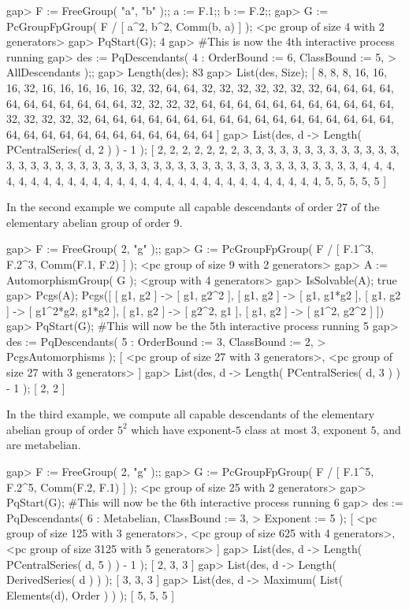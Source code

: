 \beginexample
gap> F := FreeGroup( "a", "b" );; a := F.1;; b := F.2;;
gap> G := PcGroupFpGroup( F / [ a^2, b^2, Comm(b, a) ] );
<pc group of size 4 with 2 generators>
gap> PqStart(G);
4
gap> #This is now the 4th interactive process running
gap> des := PqDescendants( 4 : OrderBound := 6, ClassBound := 5,
>                              AllDescendants );;
gap> Length(des);
83
gap> List(des, Size);
[ 8, 8, 8, 16, 16, 16, 32, 16, 16, 16, 16, 16, 32, 32, 64, 64, 32, 32, 32, 
  32, 32, 32, 32, 64, 64, 64, 64, 64, 64, 64, 64, 64, 64, 64, 32, 32, 32, 32, 
  64, 64, 64, 64, 64, 64, 64, 64, 64, 64, 64, 32, 32, 32, 32, 32, 64, 64, 64, 
  64, 64, 64, 64, 64, 64, 64, 64, 64, 64, 64, 64, 64, 64, 64, 64, 64, 64, 64, 
  64, 64, 64, 64, 64, 64, 64 ]
gap> List(des, d -> Length( PCentralSeries( d, 2 ) ) - 1 );
[ 2, 2, 2, 2, 2, 2, 2, 3, 3, 3, 3, 3, 3, 3, 3, 3, 3, 3, 3, 3, 3, 3, 3, 3, 3, 
  3, 3, 3, 3, 3, 3, 3, 3, 3, 3, 3, 3, 3, 3, 3, 3, 3, 3, 3, 3, 3, 3, 3, 3, 4, 
  4, 4, 4, 4, 4, 4, 4, 4, 4, 4, 4, 4, 4, 4, 4, 4, 4, 4, 4, 4, 4, 4, 4, 4, 4, 
  4, 4, 4, 5, 5, 5, 5, 5 ]
\endexample

In the second example we compute all  capable descendants of order  27 of
the  elementary abelian group of order 9.  

\beginexample
gap> F := FreeGroup( 2, "g" );;                                 
gap> G := PcGroupFpGroup( F / [ F.1^3, F.2^3, Comm(F.1, F.2) ] );
<pc group of size 9 with 2 generators>
gap> A := AutomorphismGroup( G );
<group with 4 generators>
gap> IsSolvable(A);
true
gap> Pcgs(A);
Pcgs([ [ g1, g2 ] -> [ g1, g2^2 ], [ g1, g2 ] -> [ g1, g1*g2 ], 
  [ g1, g2 ] -> [ g1^2*g2, g1*g2 ], [ g1, g2 ] -> [ g2^2, g1 ], 
  [ g1, g2 ] -> [ g1^2, g2^2 ] ])
gap> PqStart(G); #This will now be the 5th interactive process running
5
gap> des := PqDescendants( 5 : OrderBound := 3, ClassBound := 2,
>                              PcgsAutomorphisms );
[ <pc group of size 27 with 3 generators>, 
  <pc group of size 27 with 3 generators> ]
gap> List(des, d -> Length( PCentralSeries( d, 3 ) ) - 1 );
[ 2, 2 ]
\endexample

In  the  third  example,  we  compute  all  capable  descendants  of  the
elementary abelian group of order  $5^2$ which have exponent-$5$ class at
most $3$, exponent $5$, and are metabelian.

\beginexample
gap> F := FreeGroup( 2, "g" );;
gap> G := PcGroupFpGroup( F / [ F.1^5, F.2^5, Comm(F.2, F.1) ] );
<pc group of size 25 with 2 generators>
gap> PqStart(G); #This will now be the 6th interactive process running
6
gap> des := PqDescendants( 6 : Metabelian, ClassBound := 3,
>                              Exponent := 5 );
[ <pc group of size 125 with 3 generators>, 
  <pc group of size 625 with 4 generators>, 
  <pc group of size 3125 with 5 generators> ]
gap> List(des, d -> Length( PCentralSeries( d, 5 ) ) - 1 );
[ 2, 3, 3 ]
gap> List(des, d -> Length( DerivedSeries( d ) ) );
[ 3, 3, 3 ]
gap> List(des, d -> Maximum( List( Elements(d), Order ) ) );
[ 5, 5, 5 ]
\endexample

